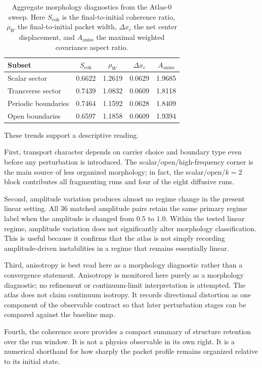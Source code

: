 \documentclass[11pt]{article}
\begin{document}
\begin{table}[t]
\centering
\begin{tabular}{lcccc}
\hline
Subset & $S_{\mathrm{coh}}$ & $\rho_W$ & $\Delta x_c$ & $A_{\mathrm{aniso}}$ \\
\hline
Scalar sector & 0.6622 & 1.2619 & 0.0629 & 1.9685 \\
Transverse sector & 0.7439 & 1.0832 & 0.0609 & 1.8118 \\
Periodic boundaries & 0.7464 & 1.1592 & 0.0628 & 1.8409 \\
Open boundaries & 0.6597 & 1.1858 & 0.0609 & 1.9394 \\
\hline
\end{tabular}
\caption{Aggregate morphology diagnostics from the Atlas-0 sweep. Here $S_{\mathrm{coh}}$ is the final-to-initial coherence ratio, $\rho_W$ the final-to-initial packet width, $\Delta x_c$ the net center displacement, and $A_{\mathrm{aniso}}$ the maximal weighted covariance aspect ratio.}
\label{tab:aggregate-diagnostics}
\end{table}

These trends support a descriptive reading.

First, transport character depends on carrier choice and boundary type even before any perturbation is introduced. The scalar/open/high-frequency corner is the main source of less organized morphology; in fact, the scalar/open/$k=2$ block contributes all fragmenting runs and four of the eight diffusive runs.

Second, amplitude variation produces almost no regime change in the present linear setting. All 36 matched amplitude pairs retain the same primary regime label when the amplitude is changed from $0.5$ to $1.0$. Within the tested linear regime, amplitude variation does not significantly alter morphology classification. This is useful because it confirms that the atlas is not simply recording amplitude-driven instabilities in a regime that remains essentially linear.

Third, anisotropy is best read here as a morphology diagnostic rather than a convergence statement. Anisotropy is monitored here purely as a morphology diagnostic; no refinement or continuum-limit interpretation is attempted. The atlas does not claim continuum isotropy. It records directional distortion as one component of the observable contract so that later perturbation stages can be compared against the baseline map.

Fourth, the coherence score provides a compact summary of structure retention over the run window. It is not a physics observable in its own right. It is a numerical shorthand for how sharply the packet profile remains organized relative to its initial state.
\end{document}
